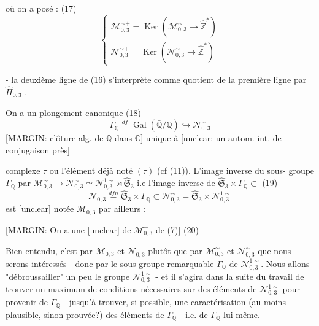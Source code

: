 \begin{enumerate}
où on a posé :
(17) $$ \begin{cases} \mathcal{M}_{0,3}^{\sim +} = \operatorname{Ker}(\mathcal{M}_{0,3}^\sim \to \hat{\mathbb{Z}}^*) \\ \mathcal{N}_{0,3}^{\sim +} = \operatorname{Ker}(\mathcal{N}_{0,3}^\sim \to \hat{\mathbb{Z}}^*) \end{cases} $$

- la deuxième ligne de (16) s'interprète comme quotient de la première ligne par $\hat{\Pi}_{0,3}$ .

On a un plongement canonique
(18) $$ \Gamma_{\mathbb{Q}} \stackrel{df}{=} \operatorname{Gal}(\bar{\mathbb{Q}}/\mathbb{Q}) \hookrightarrow \mathcal{N}_{0,3}^\sim $$
[MARGIN: clôture alg. de $\mathbb{Q}$ dans $\mathbb{C}$]
unique à [unclear: un autom. int. de conjugaison près]

\newpage


complexe $\tau$ ou l'élément déjà noté $(\tau)$
(cf (11)). L'image inverse du sous-
groupe $\Gamma_{\mathbb{Q}}$ par $\mathcal{M}_{0,3}^{\sim} \to \mathcal{N}_{0,3}^{\sim} \simeq \mathcal{N}_{0,3}^{1 \sim} \rtimes \hat{\mathfrak{S}}_3$
i.e l'image inverse de $\hat{\mathfrak{S}}_3 \times \Gamma_{\mathbb{Q}} \subset$
(19) $$ \mathcal{N}_{0,3} \overset{dfn}{=} \hat{\mathfrak{S}}_3 \times \Gamma_{\mathbb{Q}} \subset \mathcal{N}_{0,3}^{\sim} = \hat{\mathfrak{S}}_3 \times \mathcal{N}_{0,3}^{1 \sim} $$
est [unclear] notée $\mathcal{M}_{0,3}$ par ailleurs :

[MARGIN: On a une [unclear] de $\mathcal{M}_{0,3}^{\sim}$ de (7)]
(20)

Bien entendu, c'est par $\mathcal{M}_{0,3}$ et $\mathcal{N}_{0,3}$ plutôt que
par $\mathcal{M}_{0,3}^{\sim}$ et $\mathcal{N}_{0,3}^{\sim}$ que nous serons intéressés -
donc par le sous-groupe remarquable $\Gamma_{\mathbb{Q}}$ de
$\mathcal{N}_{0,3}^{1 \sim}$. Nous allons "débroussailler" un peu
le groupe $\mathcal{N}_{0,3}^{1 \sim}$ - et il s'agira dans la suite
du travail de trouver un maximum
de conditions nécessaires sur des éléments
de $\mathcal{N}_{0,3}^{1 \sim}$ pour provenir de $\Gamma_{\mathbb{Q}}$ - jusqu'à
trouver, si possible, une caractérisation (au
moins plausible, sinon prouvée?) des éléments
de $\Gamma_{\mathbb{Q}}$ - i.e. de $\Gamma_{\mathbb{Q}}$ lui-même.


\end{enumerate}
